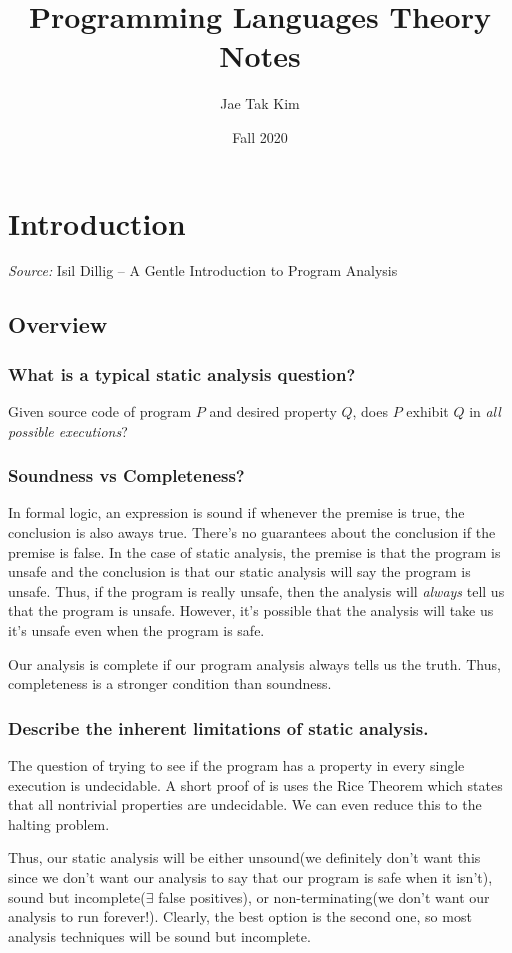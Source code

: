 \documentclass[12pt]{article}
\title{Programming Languages Theory Notes}
\author{Jae Tak Kim
}
\date{Fall 2020}
\theoremstyle{remark}
\theoremstyle{remark}
\begin{document}
\maketitle
\tableofcontents
\newpage

\section{Introduction}
\textit{Source:} Isil Dillig -- A Gentle Introduction to Program Analysis
\subsection{Overview}

\subsubsection{What is a typical static analysis question?}
Given source code of program $P$ and desired property $Q$, does $P$ exhibit $Q$ in \textit{all possible executions}?

\subsubsection{Soundness vs Completeness?}
In formal logic, an expression is sound if whenever the premise is true, the conclusion is also aways true. There's no guarantees about the conclusion if the premise is false. In the case of static analysis, the premise is that the program is unsafe and the conclusion is that our static analysis will say the program is unsafe. Thus, if the program is really unsafe, then the analysis will \textit{always} tell us that the program is unsafe. However, it's possible that the analysis will take us it's unsafe even when the program is safe.

Our analysis is complete if our program analysis always tells us the truth. Thus, completeness is a stronger condition than soundness.

\subsubsection{Describe the inherent limitations of static analysis.}
The question of trying to see if the program has a property in every single execution is undecidable. A short proof of is uses the Rice Theorem which states that all nontrivial properties are undecidable. We can even reduce this to the halting problem. 

Thus, our static analysis will be either unsound(we definitely don't want this since we don't want our analysis to say that our program is safe when it isn't), sound but incomplete($\exists$ false positives), or non-terminating(we don't want our analysis to run forever!). Clearly, the best option is the second one, so most analysis techniques will be sound but incomplete.
\end{document}
